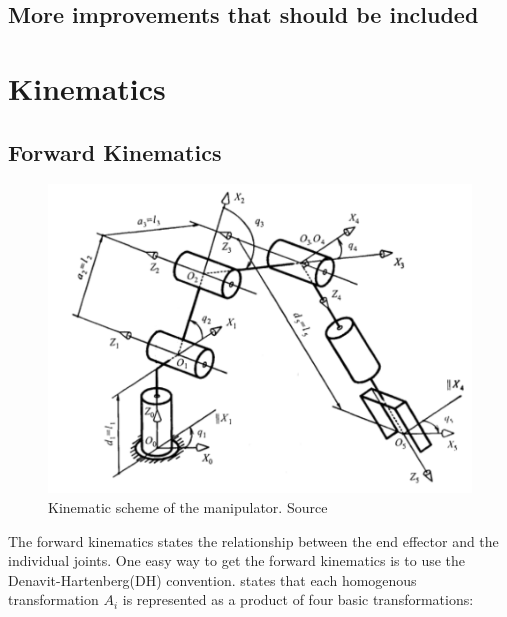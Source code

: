 \subsection{More improvements that should be included}














\section{Kinematics}


\subsection{Forward Kinematics}
    
\begin{figure}[htbp]
  \centering
  \includegraphics[width=.9\textwidth]{img/DHconv.png}
  \caption{Kinematic scheme of the manipulator. Source \cite{Kinematics}}
  \label{fig:dhf}
\end{figure}

The forward kinematics states the relationship between the end effector and the individual joints. One easy way to get the forward kinematics is to use the Denavit-Hartenberg(DH) convention. \cite{spong} states that each homogenous transformation $A_i$ is represented as a product of four basic transformations: 


